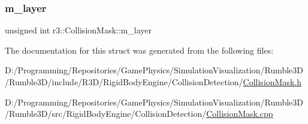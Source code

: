 \mbox{\label{structr3_1_1_collision_mask_a4e3ed2227bb1782f7c6dc948a8427620}} 
\subsubsection{\texorpdfstring{m\+\_\+layer}{m\_layer}}
{\footnotesize\ttfamily unsigned int r3\+::\+Collision\+Mask\+::m\+\_\+layer}



The documentation for this struct was generated from the following files\+:\begin{DoxyCompactItemize}
\item 
D\+:/\+Programming/\+Repositories/\+Game\+Physics/\+Simulation\+Visualization/\+Rumble3\+D/\+Rumble3\+D/include/\+R3\+D/\+Rigid\+Body\+Engine/\+Collision\+Detection/\mbox{\hyperlink{_collision_mask_8h}{Collision\+Mask.\+h}}\item 
D\+:/\+Programming/\+Repositories/\+Game\+Physics/\+Simulation\+Visualization/\+Rumble3\+D/\+Rumble3\+D/src/\+Rigid\+Body\+Engine/\+Collision\+Detection/\mbox{\hyperlink{_collision_mask_8cpp}{Collision\+Mask.\+cpp}}\end{DoxyCompactItemize}
